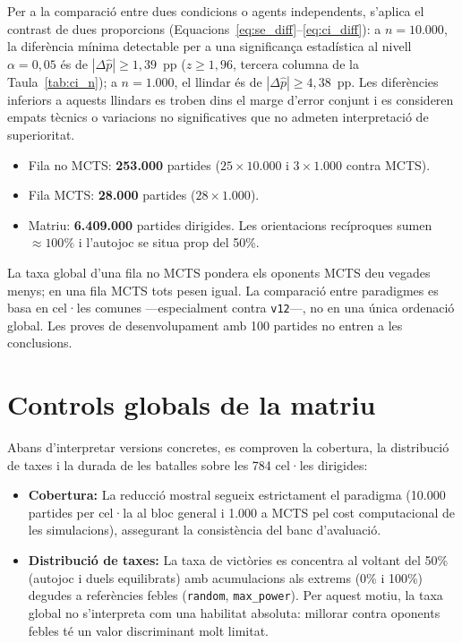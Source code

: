 Per a la comparació entre dues condicions o agents independents, s'aplica el contrast de dues proporcions (Equacions~\ref{eq:se_diff}--\ref{eq:ci_diff}): a $n=10.000$, la diferència mínima detectable per a una significança estadística al nivell $\alpha=0{,}05$ és de $|\Delta \hat{p}| \ge 1{,}39$~pp ($z \ge 1{,}96$, tercera columna de la Taula~\ref{tab:ci_n}); a $n=1.000$, el llindar és de $|\Delta \hat{p}| \ge 4{,}38$~pp. Les diferències inferiors a aquests llindars es troben dins el marge d'error conjunt i es consideren empats tècnics o variacions no significatives que no admeten interpretació de superioritat.

\begin{itemize}
    \item Fila no MCTS: \textbf{253.000} partides ($25\times 10.000$ i $3\times 1.000$ contra MCTS).
    \item Fila MCTS: \textbf{28.000} partides ($28\times 1.000$).
    \item Matriu: \textbf{6.409.000} partides dirigides. Les orientacions recíproques sumen $\approx 100\%$ i l'autojoc se situa prop del 50\%.
\end{itemize}

La taxa global d'una fila no MCTS pondera els oponents MCTS deu vegades menys; en una fila MCTS tots pesen igual. La comparació entre paradigmes es basa en cel·les comunes ---especialment contra \texttt{v12}---, no en una única ordenació global. Les proves de desenvolupament amb 100 partides no entren a les conclusions.

\section{Controls globals de la matriu}
\label{sec:res_controls}

Abans d'interpretar versions concretes, es comproven la cobertura, la distribució de taxes i la durada de les batalles sobre les 784 cel·les dirigides:
\begin{itemize}
    \item \textbf{Cobertura:} La reducció mostral segueix estrictament el paradigma (10.000 partides per cel·la al bloc general i 1.000 a MCTS pel cost computacional de les simulacions), assegurant la consistència del banc d'avaluació.
    \item \textbf{Distribució de taxes:} La taxa de victòries es concentra al voltant del 50\% (autojoc i duels equilibrats) amb acumulacions als extrems (0\% i 100\%) degudes a referències febles (\texttt{random}, \texttt{max\_power}). Per aquest motiu, la taxa global no s'interpreta com una habilitat absoluta: millorar contra oponents febles té un valor discriminant molt limitat.
\end{itemize}

